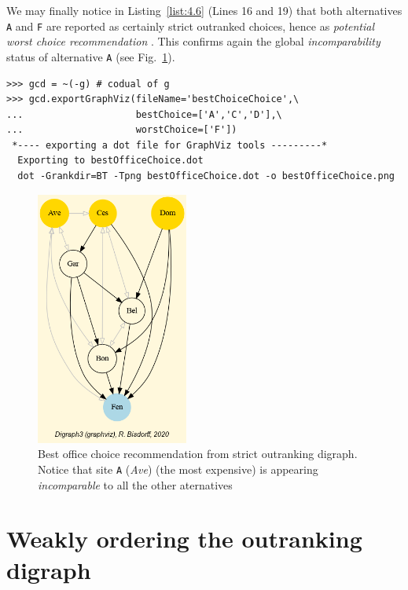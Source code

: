We may finally notice in Listing~\ref{list:4.6} (Lines 16 and 19) that both alternatives \texttt{A} and \texttt{F} are reported as certainly strict outranked choices, hence as \emph{potential worst choice recommendation} . This confirms again the global \emph{incomparability} status of alternative \texttt{A} (see Fig.~\ref{fig:4.3}).
\begin{lstlisting}
>>> gcd = ~(-g) # codual of g
>>> gcd.exportGraphViz(fileName='bestChoiceChoice',\
...                    bestChoice=['A','C','D'],\
...                    worstChoice=['F'])
 *---- exporting a dot file for GraphViz tools ---------*
  Exporting to bestOfficeChoice.dot
  dot -Grankdir=BT -Tpng bestOfficeChoice.dot -o bestOfficeChoice.png
\end{lstlisting}
\begin{figure}[h]
\sidecaption[t]
\includegraphics[width=5cm]{Figures/bestOfficeChoice.png}
\caption{Best office choice recommendation from strict outranking digraph. Notice that site \texttt{A} (\emph{Ave}) (the most expensive) is appearing \emph{incomparable} to all the other aternatives}
\label{fig:4.3}       %
\end{figure}

\section{Weakly ordering the outranking digraph}
\label{sec:4.6}

